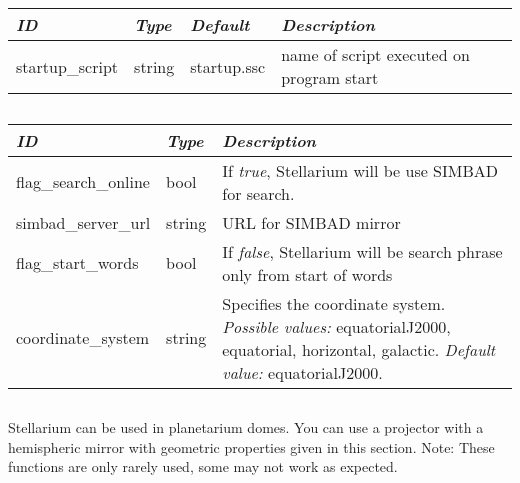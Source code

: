 \subsection{}\label{sec:config.ini:scripts}

\begin{longtabu} to \textwidth {l|l|l|X}\toprule
\emph{ID}                  & \emph{Type} & \emph{Default} & \emph{Description}\\\midrule
startup\_script                & string & startup.ssc & name of script executed on program start\\\bottomrule 
\end{longtabu}

\subsection{}\label{sec:config.ini:search}

\begin{longtabu} to \textwidth {l|l|X}\toprule
\emph{ID} & \emph{Type} & \emph{Description}\\\midrule
flag\_search\_online & bool   & If \emph{true}, Stellarium will be use SIMBAD for search.\\\midrule
simbad\_server\_url  & string & URL for SIMBAD mirror\\\midrule
flag\_start\_words   & bool   & If \emph{false}, Stellarium will be search phrase only from start of words\\\midrule
coordinate\_system   & string & Specifies the coordinate system. 
                                \emph{Possible values:} equatorialJ2000, equatorial, horizontal, galactic. \emph{Default value:} equatorialJ2000.\\
\bottomrule
\end{longtabu}

\subsection{}\label{sec:config.ini:spheric_mirror}

Stellarium can be used in planetarium domes. You can use a projector with a hemispheric mirror with geometric properties given in this section. 
Note: These functions are only rarely used, some may not work as expected.
 
